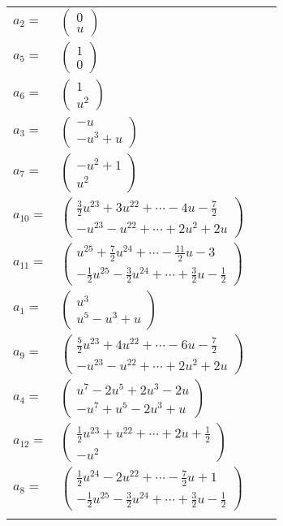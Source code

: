 \documentclass[1p]{elsarticle_modified}
\theoremstyle{definition}
\begin{document}
\begin{tabular}{m{7pt} m{180pt} m{7pt} m{180pt} }
\flushright $a_{2}=$&$\begin{pmatrix}0\\u\end{pmatrix}$ \\
\flushright $a_{5}=$&$\begin{pmatrix}1\\0\end{pmatrix}$ \\
\flushright $a_{6}=$&$\begin{pmatrix}1\\u^2\end{pmatrix}$ \\
\flushright $a_{3}=$&$\begin{pmatrix}- u\\- u^3+u\end{pmatrix}$ \\
\flushright $a_{7}=$&$\begin{pmatrix}- u^2+1\\u^2\end{pmatrix}$ \\
\flushright $a_{10}=$&$\begin{pmatrix}\frac{3}{2} u^{23}+3 u^{22}+\cdots-4 u-\frac{7}{2}\\- u^{23}- u^{22}+\cdots+2 u^2+2 u\end{pmatrix}$ \\
\flushright $a_{11}=$&$\begin{pmatrix}u^{25}+\frac{7}{2} u^{24}+\cdots-\frac{11}{2} u-3\\-\frac{1}{2} u^{25}-\frac{3}{2} u^{24}+\cdots+\frac{3}{2} u-\frac{1}{2}\end{pmatrix}$ \\
\flushright $a_{1}=$&$\begin{pmatrix}u^3\\u^5- u^3+u\end{pmatrix}$ \\
\flushright $a_{9}=$&$\begin{pmatrix}\frac{5}{2} u^{23}+4 u^{22}+\cdots-6 u-\frac{7}{2}\\- u^{23}- u^{22}+\cdots+2 u^2+2 u\end{pmatrix}$ \\
\flushright $a_{4}=$&$\begin{pmatrix}u^7-2 u^5+2 u^3-2 u\\- u^7+u^5-2 u^3+u\end{pmatrix}$ \\
\flushright $a_{12}=$&$\begin{pmatrix}\frac{1}{2} u^{23}+u^{22}+\cdots+2 u+\frac{1}{2}\\- u^2\end{pmatrix}$ \\
\flushright $a_{8}=$&$\begin{pmatrix}\frac{1}{2} u^{24}-2 u^{22}+\cdots-\frac{7}{2} u+1\\-\frac{1}{2} u^{25}-\frac{3}{2} u^{24}+\cdots+\frac{3}{2} u-\frac{1}{2}\end{pmatrix}$\\&\end{tabular}
\end{document}
